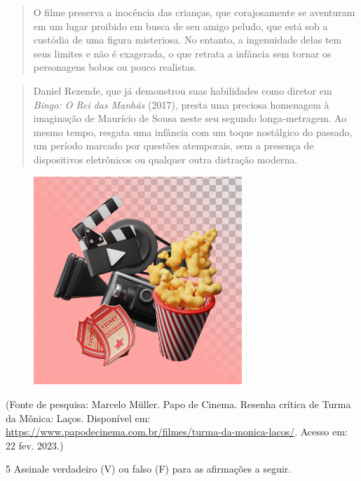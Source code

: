 \begin{quote}
O filme preserva a inocência das crianças, que corajosamente se
aventuram em um lugar proibido em busca de seu amigo peludo, que está
sob a custódia de uma figura misteriosa. No entanto, a ingenuidade delas
tem seus limites e não é exagerada, o que retrata a infância sem tornar
os personagens bobos ou pouco realistas.
\end{quote}

\begin{quote}
Daniel Rezende, que já demonstrou suas habilidades como diretor em
\emph{Bingo: O Rei das Manhãs} (2017), presta uma preciosa homenagem à
imaginação de Maurício de Sousa neste seu segundo longa-metragem. Ao
mesmo tempo, resgata uma infância com um toque nostálgico do passado, um
período marcado por questões atemporais, sem a presença de dispositivos
eletrônicos ou qualquer outra distração moderna.
\end{quote}

\begin{figure}
\includegraphics[width=0.7\textwidth]{./imgSAEB_6_POR/freepik/PORT_6_IMG-3.jpeg}
\end{figure}

(Fonte de pesquisa: Marcelo Müller. Papo de Cinema. Resenha crítica de
Turma da Mônica: Laços. Disponível em:
\url{https://www.papodecinema.com.br/filmes/turma-da-monica-lacos/}.
Acesso em: 22 fev. 2023.)

\num{5} Assinale verdadeiro (V) ou falso (F) para as afirmações a
seguir.

